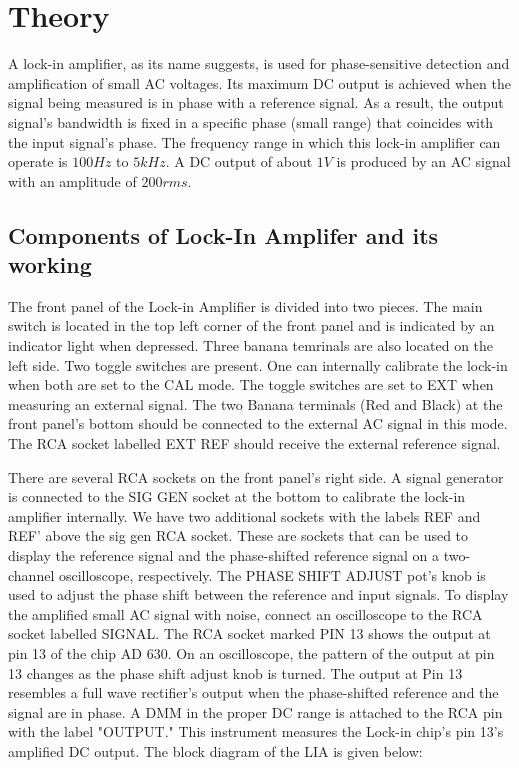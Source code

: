 \section{Theory}
	A lock-in amplifier, as its name suggests, is used for phase-sensitive detection and amplification of small AC voltages. Its maximum DC output is achieved when the signal being measured is in phase with a reference signal. As a result, the output signal's bandwidth is fixed in a specific phase (small range) that coincides with the input signal's phase. The frequency range in which this lock-in amplifier can operate is $100 Hz$ to $5 kHz$. A DC output of about $1V$ is produced by an AC signal with an amplitude of $200 rms$.

	\subsection{Components of Lock-In Amplifer and its working}
		The front panel of the Lock-in Amplifier is divided into two pieces. The main switch is located in the top left corner of the front panel and is indicated by an indicator light when depressed. Three banana temrinals are also located on the left side. Two toggle switches are present. One can internally calibrate the lock-in when both are set to the CAL mode. The toggle switches are set to EXT when measuring an external signal. The two Banana terminals (Red and Black) at the front panel's bottom should be connected to the external AC signal in this mode. The RCA socket labelled EXT REF should receive the external reference signal.

		There are several RCA sockets on the front panel's right side. A signal generator is connected to the SIG GEN socket at the bottom to calibrate the lock-in amplifier internally. We have two additional sockets with the labels REF and REF' above the sig gen RCA socket. These are sockets that can be used to display the reference signal and the phase-shifted reference signal on a two-channel oscilloscope, respectively. The PHASE SHIFT ADJUST pot's knob is used to adjust the phase shift between the reference and input signals. To display the amplified small AC signal with noise, connect an oscilloscope to the RCA socket labelled SIGNAL. The RCA socket marked PIN 13 shows the output at pin 13 of the chip AD 630. On an oscilloscope, the pattern of the output at pin 13 changes as the phase shift adjust knob is turned. The output at Pin 13 resembles a full wave rectifier's output when the phase-shifted reference and the signal are in phase. A DMM in the proper DC range is attached to the RCA pin with the label "OUTPUT." This instrument measures the Lock-in chip's pin 13's amplified DC output. The block diagram of the LIA is given below:

